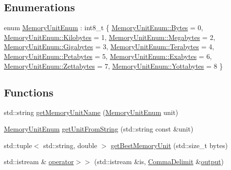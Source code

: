 \subsection*{Enumerations}
\begin{DoxyCompactItemize}
\item 
enum \hyperlink{namespacevt_1_1util_1_1memory_a64df3d84293b34009f78e2a1db2f9bb6}{Memory\+Unit\+Enum} \+: int8\+\_\+t \{ \newline
\hyperlink{namespacevt_1_1util_1_1memory_a64df3d84293b34009f78e2a1db2f9bb6a600e754f49b68aa0fc90a9cd64eb7051}{Memory\+Unit\+Enum\+::\+Bytes} = 0, 
\hyperlink{namespacevt_1_1util_1_1memory_a64df3d84293b34009f78e2a1db2f9bb6aa3a6c675a174320497f3bed7e8dc3329}{Memory\+Unit\+Enum\+::\+Kilobytes} = 1, 
\hyperlink{namespacevt_1_1util_1_1memory_a64df3d84293b34009f78e2a1db2f9bb6a2276a1b157f2813f3b65d04c0b1c56f6}{Memory\+Unit\+Enum\+::\+Megabytes} = 2, 
\hyperlink{namespacevt_1_1util_1_1memory_a64df3d84293b34009f78e2a1db2f9bb6af6f7ad0fd5914138fb449b9011c8de7a}{Memory\+Unit\+Enum\+::\+Gigabytes} = 3, 
\newline
\hyperlink{namespacevt_1_1util_1_1memory_a64df3d84293b34009f78e2a1db2f9bb6a9a2365433d590975874f09f0d5b5216d}{Memory\+Unit\+Enum\+::\+Terabytes} = 4, 
\hyperlink{namespacevt_1_1util_1_1memory_a64df3d84293b34009f78e2a1db2f9bb6a05a340fbd2fb19c6bf2a92a854b8db6f}{Memory\+Unit\+Enum\+::\+Petabytes} = 5, 
\hyperlink{namespacevt_1_1util_1_1memory_a64df3d84293b34009f78e2a1db2f9bb6a1e7535056f489fc82f76fae19149b2ef}{Memory\+Unit\+Enum\+::\+Exabytes} = 6, 
\hyperlink{namespacevt_1_1util_1_1memory_a64df3d84293b34009f78e2a1db2f9bb6ae7d195686624d72a3737ed4d84058f41}{Memory\+Unit\+Enum\+::\+Zettabytes} = 7, 
\newline
\hyperlink{namespacevt_1_1util_1_1memory_a64df3d84293b34009f78e2a1db2f9bb6a2be006d4ea302bcbb425e28e3b0c2e7b}{Memory\+Unit\+Enum\+::\+Yottabytes} = 8
 \}
\end{DoxyCompactItemize}
\subsection*{Functions}
\begin{DoxyCompactItemize}
\item 
std\+::string \hyperlink{namespacevt_1_1util_1_1memory_a6a1de4e8806e74e6e0ef92e4262b654b}{get\+Memory\+Unit\+Name} (\hyperlink{namespacevt_1_1util_1_1memory_a64df3d84293b34009f78e2a1db2f9bb6}{Memory\+Unit\+Enum} unit)
\item 
\hyperlink{namespacevt_1_1util_1_1memory_a64df3d84293b34009f78e2a1db2f9bb6}{Memory\+Unit\+Enum} \hyperlink{namespacevt_1_1util_1_1memory_aeceb7d7ac924dd3d88a58eab5ebf64f7}{get\+Unit\+From\+String} (std\+::string const \&unit)
\item 
std\+::tuple$<$ std\+::string, double $>$ \hyperlink{namespacevt_1_1util_1_1memory_ac3c8e7e8b253b5d9a4b4c7c662f22305}{get\+Best\+Memory\+Unit} (std\+::size\+\_\+t bytes)
\item 
std\+::istream \& \hyperlink{namespacevt_1_1util_1_1memory_afe1acbbca9aa1bd7310548cefd40045c}{operator$>$$>$} (std\+::istream \&is, \hyperlink{structvt_1_1util_1_1memory_1_1_comma_delimit}{Comma\+Delimit} \&\hyperlink{namespacevt_ad3ca3e8710dd3c8badff897f8de3c858}{output})
\end{DoxyCompactItemize}
